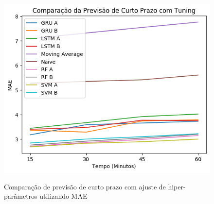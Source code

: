 \begin{figure}[H]
    \centering
    \includegraphics[scale=0.8]{monography/img/comparisons/comparacao_da_previsao_de_curto_prazo_com_tuning_mae.png}
    \label{figure:previsao_de_curto_prazo_com_tuning_mae_r}
    \caption{Comparação de previsão de curto prazo com ajuste de hiper-parâmetros utilizando MAE}
\end{figure}